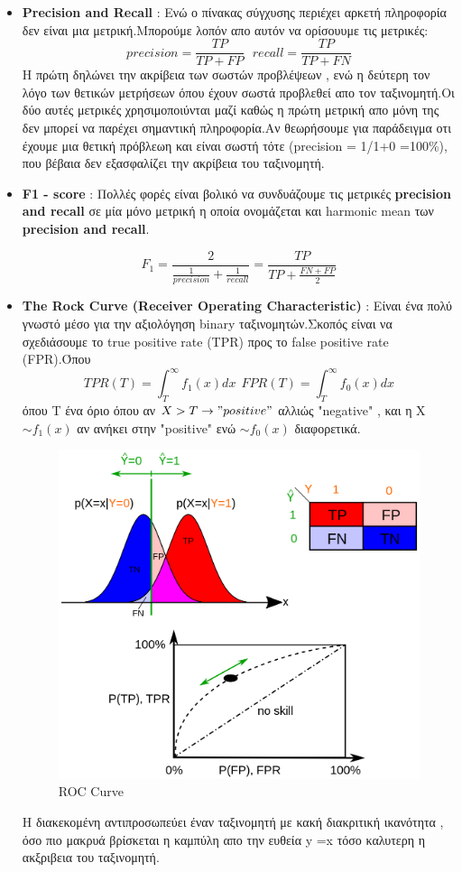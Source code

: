 \documentclass[12pt,a4paper]{article}
\begin{document}
\begin{itemize}
\item \textbf{Precision and Recall} : Ενώ ο πίνακας σύγχυσης περιέχει αρκετή πληροφορία δεν είναι μια μετρική.Μπορούμε λοπόν απο αυτόν να ορίσουυμε τις μετρικές:
$$precision = \frac{TP}{TP + FP} \ \ \  recall = \frac{TP}{TP + FN}$$
Η πρώτη δηλώνει την ακρίβεια των σωστών προβλέψεων , ενώ η δεύτερη τον λόγο των θετικών μετρήσεων όπου έχουν σωστά προβλεθεί απο τον ταξινομητή.Οι δύο αυτές μετρικές χρησιμοποιύνται μαζί καθώς η πρώτη μετρική απο μόνη της δεν μπορεί να παρέχει σημαντική πληροφορία.Αν θεωρήσουμε για παράδειγμα οτι έχουμε μια θετική πρόβλεωη και είναι σωστή τότε (precision = 1/1+0 =100\%), που βέβαια δεν εξασφαλίζει την ακρίβεια του ταξινομητή.

\item \textbf{F1 - score} : Πολλές φορές είναι βολικό να συνδυάζουμε τις μετρικές \textbf{precision and recall} σε μία μόνο μετρική η οποία ονομάζεται και harmonic mean των \textbf{precision and recall}.

$$F_1 = \frac{2}{\frac{1}{precision} + \frac{1}{recall}} = \frac{TP}{TP + \frac{FN + FP}{2}}$$


\item \textbf{The Rock Curve (Receiver Operating Characteristic)} : Είναι ένα πολύ γνωστό μέσο για την αξιολόγηση binary ταξινομητών.Σκοπός είναι να σχεδιάσουμε το true positive rate (TPR) προς το false positive rate (FPR).Όπου
$$TPR(T) = \int_T^{\infty} f_1(x)dx \ \ FPR(T) = \int_T^{\infty}f_0(x)dx$$
όπου T ένα όριο όπου αν $X>T \to "positive"$ αλλιώς "negative" , και η X $\sim f_1(x)$ αν ανήκει στην "positive" ενώ $\sim f_0(x)$ διαφορετικά.
\begin{figure}[H]
\centering
\includegraphics[width=0.50\linewidth,height=0.30\textheight]{Images/plot25}
\caption{ROC Curve}
\label{fig:multi}
\end{figure}

Η διακεκομένη αντιπροσωπεύει έναν ταξινομητή με κακή διακριτική ικανότητα  , όσο πιο μακρυά βρίσκεται η καμπύλη απο την ευθεία y =x τόσο καλυτερη η ακξριβεια του ταξινομητή.
\end{itemize}
\end{document}
